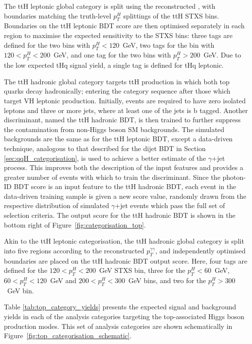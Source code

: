 The ttH leptonic global category is split using the reconstructed \ptgg, with boundaries matching the truth-level $p_T^H$ splittings of the ttH STXS bins. Boundaries on the ttH leptonic BDT score are then optimised separately in each region to maximise the expected sensitivity to the STXS bins: three tags are defined for the two bins with $p_T^H<120$~GeV, two tags for the bin with $120<p_T^H<200$~GeV, and one tag for the two bins with $p_T^H>200$~GeV. Due to the low expected tHq signal yield, a single tag is defined for tHq leptonic.

The ttH hadronic global category targets ttH production in which both top quarks decay hadronically; entering the category sequence after those which target VH leptonic production. Initially, events are required to have zero isolated leptons and three or more jets, where at least one of the jets is b tagged. Another discriminant, named the ttH hadronic BDT, is then trained to further suppress the contamination from non-Higgs boson SM backgrounds. The simulated backgrounds are the same as for the ttH leptonic BDT, except a data-driven technique, analogous to that described for the dijet BDT in Section \ref{sec:qqH_categorisation}, is used to achieve a better estimate of the $\gamma$+jet process. This improves both the description of the input features and provides a greater number of events with which to train the discriminant. Since the photon-ID BDT score is an input feature to the ttH hadronic BDT, each event in the data-driven training sample is given a new score value, randomly drawn from the respective distribution of simulated $\gamma$+jet events which pass the full set of selection criteria. The output score for the ttH hadronic BDT is shown in the bottom right of Figure~\ref{fig:categorisation_top}.

Akin to the ttH leptonic categorisation, the ttH hadronic global category is split into five regions according to the reconstructed $p_T^{\gamma\gamma}$, and independently optimised boundaries are placed on the ttH hadronic BDT output score. Here, four tags are defined for the $120<p_T^H<200$~GeV STXS bin, three for the $p_T^H<60$~GeV, $60<p_T^H<120$~GeV and $200<p_T^H<300$~GeV bins, and two for the $p_T^H>300$~GeV bin. 

Table \ref{tab:top_category_yields} presents the expected signal and background yields in each of the analysis categories targeting the top-associated Higgs boson production modes. This set of analysis categories are shown schematically in Figure~\ref{fig:top_categorisation_schematic}.

